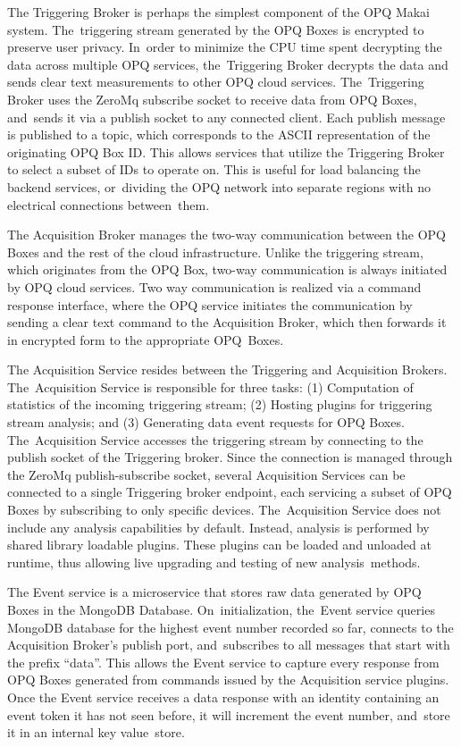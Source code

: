 \documentclass[energies,article,accept,moreauthors,pdftex]{Definitions/mdpi}
\begin{document}
The Triggering Broker is perhaps the simplest component of the OPQ Makai system. The~triggering stream generated by the OPQ Boxes is encrypted to preserve user privacy. In~order to minimize the CPU time spent decrypting the data across multiple OPQ services, the~Triggering Broker decrypts the data and sends clear text measurements to other OPQ cloud services. The~Triggering Broker uses the ZeroMq subscribe socket to receive data from OPQ Boxes, and~sends it via a publish socket to any connected client. Each publish message is published to a topic, which corresponds to the ASCII representation of the originating OPQ Box ID. This allows services that utilize the Triggering Broker to select a subset of IDs to operate on. This is useful for load balancing the backend services, or~dividing the OPQ network into separate regions with no electrical connections between~them.

The Acquisition Broker manages the two-way communication between the OPQ Boxes and the rest of the cloud infrastructure. Unlike the triggering stream, which originates from the OPQ Box, two-way communication is always initiated by OPQ cloud services. Two way communication is realized via a command response interface, where the OPQ service initiates the communication by sending a clear text command to the Acquisition Broker, which then forwards it in encrypted form to the appropriate OPQ~Boxes.

The Acquisition Service resides between the Triggering and Acquisition Brokers. The~Acquisition Service is responsible for three tasks:
(1) Computation of statistics of the incoming triggering stream; (2) Hosting plugins for triggering stream analysis; and (3) Generating data event requests for OPQ Boxes. The~Acquisition Service accesses the triggering stream by connecting to the publish socket of the Triggering broker. Since the connection is managed through the ZeroMq publish-subscribe socket, several Acquisition Services can be connected to a single Triggering broker endpoint, each servicing a subset of OPQ Boxes by subscribing to only specific devices. The~Acquisition Service does not include any analysis capabilities by default. Instead, analysis is performed by shared library loadable plugins. These plugins can be loaded and unloaded at runtime, thus allowing live upgrading and testing of new analysis~methods.

The Event service is a microservice that stores raw data generated by OPQ Boxes in the MongoDB Database. On~initialization, the~Event service queries MongoDB database for the highest event number recorded so far, connects to the Acquisition Broker’s publish port, and~subscribes to all messages that start with the prefix ``data”. This allows the Event service to capture every response from OPQ Boxes generated from commands issued by the Acquisition service plugins. Once the Event service receives a data response with an identity containing an event token it has not seen before, it will increment the event number, and~store it in an internal key value~store.
\end{document}
